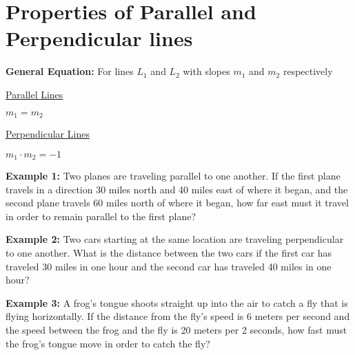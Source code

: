 \section[Linear Relationships]{Properties of Parallel and Perpendicular lines}

\textbf{General Equation:} For lines $L_1$ and $L_2$ with slopes $m_1$ and $m_2$ respectively

\begin{center}
\setlength{\columnseprule}{0pt}
\begin{multicols}{2}
\underline{Parallel Lines}

$m_1=m_2$

\columnbreak
\underline{Perpendicular Lines}

$m_1\cdot m_2=-1$
\end{multicols}
\end{center}

\vfill\textbf{Example 1:} Two planes are traveling parallel to one another. If the first plane travels in a direction 30 miles north and 40 miles east of where it began, and the second plane travels 60 miles north of where it began, how far east must it travel in order to remain parallel to the first plane?

\vfill\textbf{Example 2:} Two cars starting at the same location are traveling perpendicular to one another. What is the distance between the two cars if the first car has traveled 30 miles in one hour and the second car has traveled 40 miles in one hour?

\vfill\textbf{Example 3:} A frog's tongue shoots straight up into the air to catch a fly that is flying horizontally. If the distance from the fly's speed is 6 meters per second and the speed between the frog and the fly is 20 meters per 2 seconds, how fast must the frog's tongue move in order to catch the fly?

